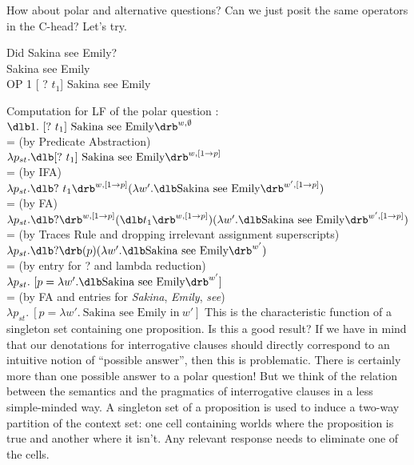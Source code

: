 How about polar and alternative questions? Can we just posit the same operators
in the C-head? Let's try.

\ex Did Sakina see Emily?\\
\null[$_{C}$ ? OP] Sakina see Emily\\
OP 1 [ ? $t_{1}$] Sakina see Emily
\xe

\ex Computation for LF of the polar question \Last:\\
$\sv{1.\ [?\ t_{1}]\ \text{Sakina see Emily}}^{{w,\emptyset}}$\\
{\small = (by Predicate Abstraction)}\\
$\lambda p_{st}. \sv{[?\ t_{1}]\ \text{Sakina see
    Emily}}^{w,[1\rightarrow p]}$\\
{\small = (by IFA)}\\
$\lambda p_{st}. \sv{?\ t_{1}}^{w,[1\rightarrow p]}(\lambda w'. \svt{Sakina see Emily}^{w',[1\rightarrow p]})$\\
{\small = (by FA)}\\
$\lambda p_{st}. \sv{?}^{w,[1\rightarrow p]}(\sv{t_{1}}^{w,[1\rightarrow p]})(\lambda w'. \svt{Sakina see Emily}^{w',[1\rightarrow p]})$\\
{\small = (by Traces Rule and dropping irrelevant assignment superscripts)}\\
$\lambda p_{st}. \sv{?}(p)(\lambda w'. \svt{Sakina see Emily}^{w'})$\\
{\small = (by entry for ? and lambda reduction)}\\
$\lambda p_{st}.\ [p = \lambda w'. \svt{Sakina see Emily}^{w'}]$\\
{\small = (by FA and entries for \emph{Sakina}, \emph{Emily}, \emph{see})}\\
$\lambda p_{st}.\ [p = \lambda w'.\ \text{Sakina see Emily in}\ w']$
\xe
%
This is the characteristic function of a singleton set containing one
proposition. Is this a good result? If we have in mind that our denotations for
interrogative clauses should directly correspond to an intuitive notion of
``possible answer'', then this is problematic. There is certainly more than one
possible answer to a polar question! But we think of the relation
between the semantics and the pragmatics of interrogative clauses in a less
simple-minded way. A singleton set of a proposition is used to induce a two-way
partition of the context set: one cell containing worlds where the proposition
is true and another where it isn't. Any relevant response needs to eliminate one
of the cells.


